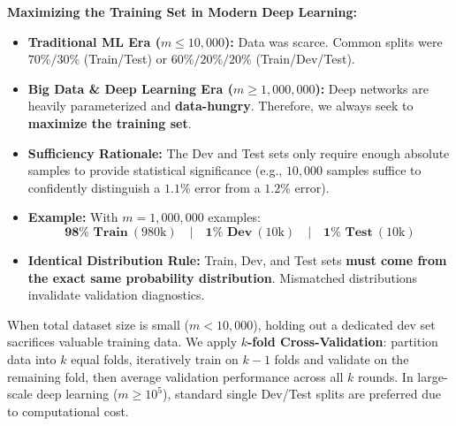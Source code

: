 \documentclass[10pt,a4paper]{article}
\begin{document}
\vspace{-2pt}

\begin{tcolorbox}[
    colframe=themeblue, colback=lightbg, arc=1.3mm, boxrule=0.5pt,
    left=5pt, right=5pt, top=2pt, bottom=2pt
]
\footnotesize
\textbf{Maximizing the Training Set in Modern Deep Learning:}
\begin{itemize}[leftmargin=8pt, itemsep=1pt, topsep=0pt]
    \item \textbf{Traditional ML Era ($m \le 10{,}000$):} Data was scarce. Common splits were $70\% / 30\%$ (Train/Test) or $60\% / 20\% / 20\%$ (Train/Dev/Test).
    \item \textbf{Big Data \& Deep Learning Era ($m \ge 1{,}000{,}000$):} Deep networks are heavily parameterized and \textbf{data-hungry}. Therefore, we always seek to \textbf{maximize the training set}.
    \item \textbf{Sufficiency Rationale:} The Dev and Test sets only require enough absolute samples to provide statistical significance (e.g., $10{,}000$ samples suffice to confidently distinguish a $1.1\%$ error from a $1.2\%$ error).
    \item \textbf{Example:} With $m = 1{,}000{,}000$ examples:
    \[
    \mathbf{98\% \text{ Train}} \ (980\text{k}) \quad\Big|\quad \mathbf{1\% \text{ Dev}} \ (10\text{k}) \quad\Big|\quad \mathbf{1\% \text{ Test}} \ (10\text{k})
    \]
    \item \textbf{Identical Distribution Rule:} Train, Dev, and Test sets \textbf{must come from the exact same probability distribution}. Mismatched distributions invalidate validation diagnostics.
\end{itemize}
\end{tcolorbox}

\vspace{-3pt}

\par
When total dataset size is small ($m < 10{,}000$), holding out a dedicated dev set sacrifices valuable training data. We apply \textbf{$k$-fold Cross-Validation}: partition data into $k$ equal folds, iteratively train on $k-1$ folds and validate on the remaining fold, then average validation performance across all $k$ rounds. In large-scale deep learning ($m \ge 10^5$), standard single Dev/Test splits are preferred due to computational cost.

\vspace{1pt}
\end{document}
